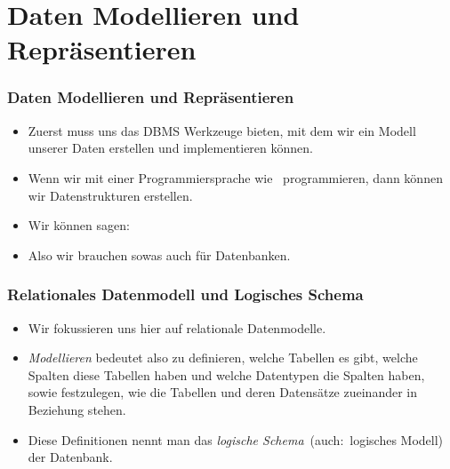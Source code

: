 \documentclass[aspectratio=169,mathserif,notheorems]{beamer}%
\begin{document}
\section{Daten Modellieren und Repräsentieren}%
%
\begin{frame}%
\frametitle{Daten Modellieren und Repräsentieren}%
\begin{itemize}%
\item Zuerst muss uns das DBMS Werkzeuge bieten, mit dem wir ein Modell unserer Daten erstellen und implementieren können.%
\item<2-> Wenn wir mit einer Programmiersprache wie \python\ programmieren, dann können wir Datenstrukturen erstellen.
\item<3-> Wir können sagen:~%
\item<5-> Also wir brauchen sowas auch für Datenbanken.%
\end{itemize}%
\end{frame}%
%
\begin{frame}%
\frametitle{Relationales Datenmodell und Logisches Schema}%
\begin{itemize}%
\item Wir fokussieren uns hier auf relationale Datenmodelle.%
\item<2-> \emph{Modellieren} bedeutet also zu definieren, welche Tabellen es gibt, welche Spalten diese Tabellen haben und welche Datentypen die Spalten haben, sowie festzulegen, wie die Tabellen und deren Datensätze zueinander in Beziehung stehen.%
\item<3-> Diese Definitionen nennt man das \emph{logische Schema}~(auch:~logisches Modell) der Datenbank.%
\end{itemize}%
\end{frame}%
%
\end{document}
